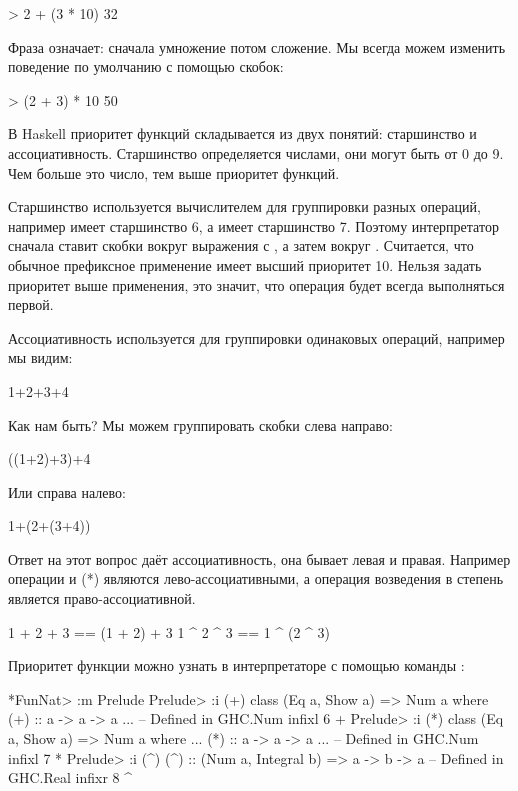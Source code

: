 \begin{code}
> 2 + (3 * 10)
32
\end{code}

Фраза  означает: сначала умножение
потом сложение. Мы всегда можем изменить поведение по умолчанию
с помощью скобок:

\begin{code}
> (2 + 3) * 10
50
\end{code}

В Haskell приоритет функций складывается из двух понятий:
старшинство и ассоциативность. Старшинство определяется числами,
они могут быть от 0 до 9. Чем больше это число, тем выше приоритет
функций. 

Старшинство используется вычислителем для группировки 
разных операций, например \In{(+)} имеет старшинство 6, а 
\In{(*)} имеет старшинство 7. Поэтому интерпретатор сначала
ставит скобки вокруг выражения с \In{(*)}, а затем вокруг \In{(+)}.
Считается, что обычное префиксное применение имеет высший приоритет 10.
Нельзя задать приоритет выше применения, это значит, что операция
 будет всегда выполняться первой.

Ассоциативность используется для группировки одинаковых
операций, например мы видим:

\begin{code}
1+2+3+4
\end{code}

Как нам быть? Мы можем группировать скобки слева направо:

\begin{code}
((1+2)+3)+4
\end{code}

Или справа налево:

\begin{code}
1+(2+(3+4))
\end{code}

Ответ на этот вопрос даёт ассоциативность, она бывает левая и
правая. Например операции \In{(+)} \In{(-)} и (*) являются лево-ассоциативными,
а операция возведения в степень \In{(^)} является право-ассоциативной.

\begin{code}
1 + 2 + 3 == (1 + 2) + 3
1 ^ 2 ^ 3 ==  1 ^ (2 ^ 3)
\end{code}


Приоритет функции можно узнать в интерпретаторе с помощью
команды :

\begin{code}
*FunNat> :m Prelude
Prelude> :i (+)
class (Eq a, Show a) => Num a where
  (+) :: a -> a -> a
  ...
  	-- Defined in GHC.Num
infixl 6 +
Prelude> :i (*)
class (Eq a, Show a) => Num a where
  ...
  (*) :: a -> a -> a
  ...
  	-- Defined in GHC.Num
infixl 7 *
Prelude> :i (^)
(^) :: (Num a, Integral b) => a -> b -> a 	-- Defined in GHC.Real
infixr 8 ^
\end{code}

